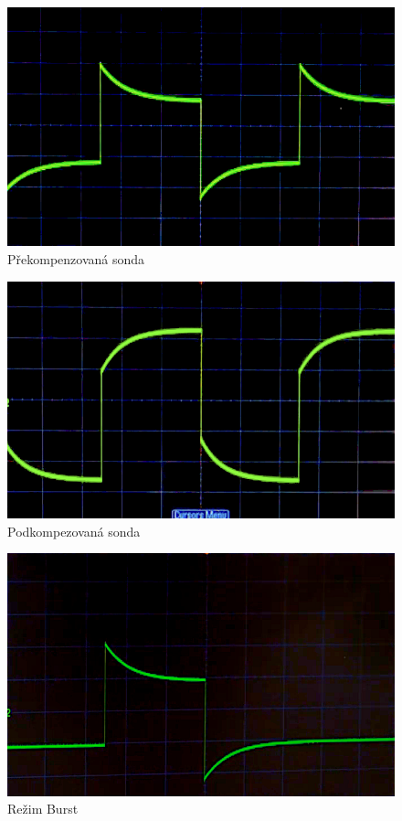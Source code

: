 \documentclass[a4paper,12pt]{article}   %
\begin{document}
\begin{figure}[h!]
  \centering
  \includegraphics[width=.8\textwidth]{overcomp.png}
  \caption{Překompenzovaná sonda}
  \label{fig:overcomp}  
\end{figure}

\begin{figure}[h!]
  \centering
  \includegraphics[width=.8\textwidth]{undercomp.png}
  \caption{Podkompezovaná sonda}
  \label{fig:undercomp}  
\end{figure}

\begin{figure}[h!]
  \centering
  \includegraphics[width=.8\textwidth]{burst.png}
  \caption{Režim Burst}
  \label{fig:burst}  
\end{figure}
\end{document}
